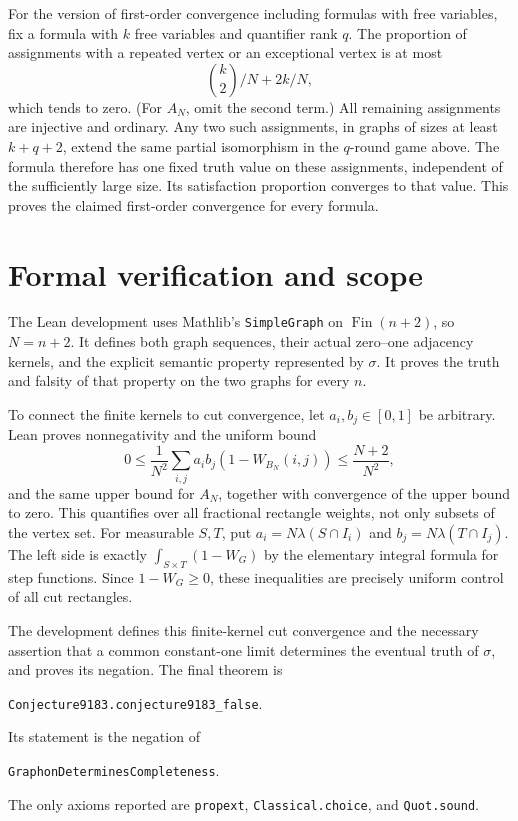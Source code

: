 \documentclass[11pt]{article}
\begin{document}
For the version of first-order convergence including formulas with free
variables, fix a formula with $k$ free variables and quantifier rank $q$.
The proportion of assignments with a repeated vertex or an exceptional
vertex is at most
\[
 \binom{k}{2}/N+2k/N,
\]
which tends to zero. (For $A_N$, omit the second term.) All remaining
assignments are injective and ordinary. Any two such assignments, in
graphs of sizes at least $k+q+2$, extend the same partial isomorphism
in the $q$-round game above. The formula therefore has one fixed truth
value on these assignments, independent of the sufficiently large size.
Its satisfaction proportion converges to that value. This proves the
claimed first-order convergence for every formula.

\section*{Formal verification and scope}
The Lean development uses Mathlib's \texttt{SimpleGraph} on
$\operatorname{Fin}(n+2)$, so $N=n+2$. It defines both graph sequences,
their actual zero--one adjacency kernels, and the explicit semantic
property represented by $\sigma$. It proves the truth and falsity of
that property on the two graphs for every $n$.

To connect the finite kernels to cut convergence, let $a_i,b_j\in[0,1]$
be arbitrary. Lean proves nonnegativity and the uniform bound
\[
 0\leq \frac1{N^2}\sum_{i,j}a_i b_j(1-W_{B_N}(i,j))
       \leq \frac{N+2}{N^2},
\]
and the same upper bound for $A_N$, together with convergence of the
upper bound to zero. This quantifies over all fractional rectangle
weights, not only subsets of the vertex set. For measurable $S,T$, put
$a_i=N\lambda(S\cap I_i)$ and $b_j=N\lambda(T\cap I_j)$.
The left side is exactly
$\int_{S\times T}(1-W_G)$ by the elementary integral formula for step
functions. Since $1-W_G\geq0$, these inequalities are precisely uniform
control of all cut rectangles.

The development defines this finite-kernel cut convergence and the
necessary assertion that a common constant-one limit determines the
eventual truth of $\sigma$, and proves its negation. The final theorem is
\begin{center}\texttt{Conjecture9183.conjecture9183\_false}.\end{center}
Its statement is the negation of
\begin{center}\texttt{GraphonDeterminesCompleteness}.\end{center}
The only axioms reported are \texttt{propext}, \texttt{Classical.choice},
and \texttt{Quot.sound}.
\end{document}
